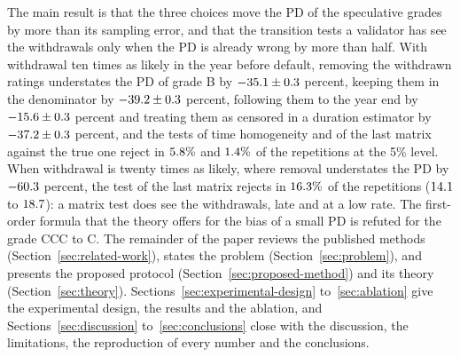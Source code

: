 The main result is that the three choices move the PD of the speculative grades by more than its sampling error, and that the transition tests a validator has see the withdrawals only when the PD is already wrong by more than half. With withdrawal ten times as likely in the year before default, removing the withdrawn ratings understates the PD of grade B by $-35.1\pm0.3$ percent, keeping them in the denominator by $-39.2\pm0.3$ percent, following them to the year end by $-15.6\pm0.3$ percent and treating them as censored in a duration estimator by $-37.2\pm0.3$ percent, and the tests of time homogeneity and of the last matrix against the true one reject in $5.8\%$ and $1.4\%$ of the repetitions at the 5\% level. When withdrawal is twenty times as likely, where removal understates the PD by $-60.3$ percent, the test of the last matrix rejects in $16.3\%$ of the repetitions ($14.1$ to $18.7$): a matrix test does see the withdrawals, late and at a low rate. The first-order formula that the theory offers for the bias of a small PD is refuted for the grade CCC to C. The remainder of the paper reviews the published methods (Section~\ref{sec:related-work}), states the problem (Section~\ref{sec:problem}), and presents the proposed protocol (Section~\ref{sec:proposed-method}) and its theory (Section~\ref{sec:theory}). Sections~\ref{sec:experimental-design} to~\ref{sec:ablation} give the experimental design, the results and the ablation, and Sections~\ref{sec:discussion} to~\ref{sec:conclusions} close with the discussion, the limitations, the reproduction of every number and the conclusions. %
